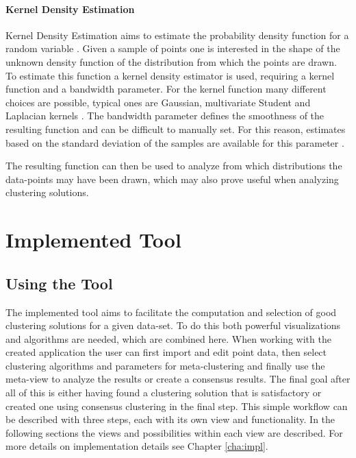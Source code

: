 \documentclass[
	a4paper,
	english,
	twoside,
	openright,               
	11pt                            
	]{report}
\begin{document}

\subsection{Kernel Density Estimation}
Kernel Density Estimation aims to estimate the probability density function for a random variable \cite{parzen1962estimation}. Given a sample of points one is interested in the shape of the unknown density function of the distribution from which the points are drawn. To estimate this function a kernel density estimator is used, requiring a kernel function and a bandwidth parameter. For the kernel function many different choices are possible, typical ones are Gaussian, multivariate Student and Laplacian kernels \cite{kim2011robust}. The bandwidth parameter defines the smoothness of the resulting function and can be difficult to manually set. For this reason, estimates based on the standard deviation of the samples are available for this parameter \cite{rulethumbdens}.

The resulting function can then be used to analyze from which distributions the data-points may have been drawn, which may also prove useful when analyzing clustering solutions.

\part{Implemented Tool}
\chapter{Using the Tool}\label{cha:Tool}
The implemented tool aims to facilitate the computation and selection of good clustering solutions for a given data-set. To do this both powerful visualizations and algorithms are needed, which are combined here. When working with the created application the user can first import and edit point data, then select clustering algorithms and parameters for meta-clustering and finally use the meta-view to analyze the results or create a consensus results. The final goal after all of this is either having found a clustering solution that is satisfactory or created one using consensus clustering in the final step. This simple workflow can be described with three steps, each with its own view and functionality. In the following sections the views and possibilities within each view are described. For more details on implementation details see Chapter \ref{cha:impl}.
\end{document}
